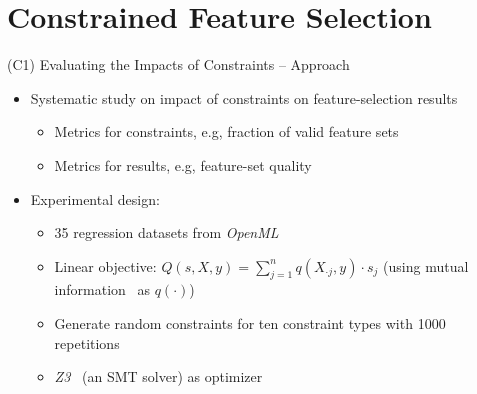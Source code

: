 \documentclass[en, navbarinline, handout]{sdqbeamer}
\begin{document}
\section{Constrained Feature Selection}

\begin{frame}[t]{(C1) Evaluating the Impacts of Constraints -- Approach}
	\begin{itemize}
		\item Systematic study on impact of constraints on feature-selection results
		\begin{itemize}
			\item Metrics for constraints, e.g, fraction of valid feature sets
			\item Metrics for results, e.g, feature-set quality
		\end{itemize}
		\pause
		\vspace{\baselineskip}
		\item Experimental design:
		\begin{itemize}
			\item 35 regression datasets from \emph{OpenML}~\cite{vanschoren2014openml}
			\item Linear objective: $Q(s,X,y) = \sum_{j=1}^{n} q(X_{\cdot{}j},y) \cdot s_j$ (using mutual information~\cite{kraskov2004estimating} as $q(\cdot)$)
			\item Generate random constraints for ten constraint types with 1000 repetitions
			\item \emph{Z3}~\cite{bjorner2015nuz, deMoura2008z3} (an SMT solver) as optimizer

\end{itemize}
\end{itemize}
\end{frame}
\end{document}
